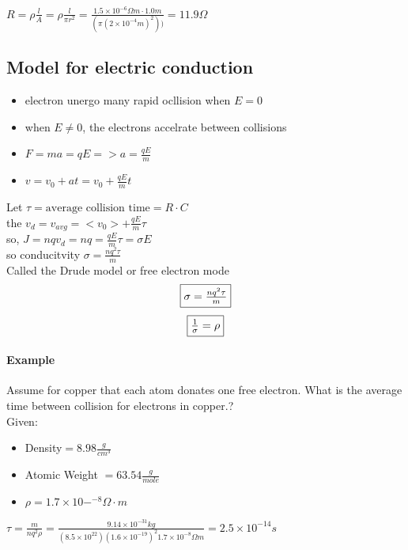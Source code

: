 \documentclass{article}
\begin{document}
    \paragraph{}$R = \rho \frac{l}{A} = \rho \frac{l}{\pi r^2} = \frac{1.5 \times 10^{-6}\Omega m \cdot 1.0 m}{(\pi (2\times 10^{-4}m)^2))} = 11.9 \Omega$    
   
    \subsection{Model for electric conduction}
    \begin{itemize}
        \item electron unergo many rapid ocllision when  $E = 0$
        \item when $E \neq 0$, the electrons accelrate between collisions
        \item $F = ma = qE => a = \frac{qE}{m}$
        \item $v = v_0 + at= v_0 + \frac{qE}{m}t $
    \end{itemize}
    Let $\tau = \text{average collision time} = R\cdot C$\\
    the  $v_d = v_{avg} = <v_0> + \frac{qE}{m}\tau$\\
    so, $J = nqv_d = nq = \frac{qE}{m}\tau = \sigma E$\\
    so conducitvity $\sigma = \frac{nq^2\tau}{m}$\\
    Called the Drude model or free electron mode\\
    $$\boxed{$$\sigma = \frac{nq^2 \tau}{m}$$}$$
    $$\boxed{$$\frac{1}{\sigma} = \rho$$}$$
    \paragraph{Example} Assume for copper that each atom donates one free electron. What is the average time between collision for electrons in copper.?
    \\Given: 
    \begin{itemize}
        \item Density$ = 8.98\frac{g}{cm^3}$
        \item Atomic Weight $ = 63.54\frac{g}{mole}$
        \item $\rho = 1.7 \times 10-^{-8}\Omega\cdot m$
    \end{itemize}
    $\tau = \frac{m}{nq^2\rho}=\frac{9.14 \times 10^{-31}kg}{(8.5\times10^22 ) (1.6\times10^{-19})^2 1.7\times10^{-8}\Omega m} = 2.5\times10^{-14}s$
\end{document}
